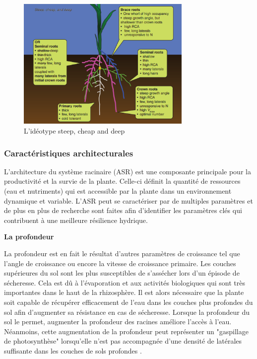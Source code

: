 \begin{figure}[ht]
\centering
\includegraphics[width=0.75\textwidth]{Image/steep, cheap and deep.png}
\caption{L'idéotype steep, cheap and deep \citep{lynch_steep_2013}}
\label{fig:steep, cheap and deep}
\end{figure}

\subsubsection{Caractéristiques architecturales}

L'architecture du système racinaire (ASR) est une composante principale pour la productivité et la survie de la plante.
Celle-ci définit la quantité de ressources (eau et nutriments) qui est accessible par la plante dans un environnement dynamique et variable. 
L'ASR peut se caractériser par de multiples paramètres et de plus en plus de recherche sont faites afin d'identifier les paramètres clés qui contribuent à une meilleure résilience hydrique.
\newline

\noindent \textbf{La profondeur}

La profondeur est en fait le résultat d'autres paramètres de croissance tel que l'angle de croissance ou encore la vitesse de croissance primaire.
Les couches supérieures du sol sont les plus susceptibles de s'assécher lors d'un épisode de sécheresse. 
Cela est dû à l'évaporation et aux activités biologiques qui sont très importantes dans le haut de la rhizosphère.
Il est alors nécessaire que la plante soit capable de récupérer efficacement de l'eau dans les couches plus profondes du sol afin d'augmenter sa résistance en cas de sécheresse.
Lorsque la profondeur du sol le permet, augmenter la profondeur des racines améliore l'accès à l'eau.
Néanmoins, cette augmentation de la profondeur peut représenter un "gaspillage de photosynthèse" lorsqu'elle n'est pas accompagnée d'une densité de latérales suffisante dans les couches de sols profondes \citep{tardieu_any_2012}.
\newline

